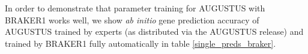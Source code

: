 \documentclass[a4paper,10pt]{report}
\begin{document}
% 

In order to demonstrate that parameter training for AUGUSTUS with BRAKER1 works well, we show \textit{ab initio} gene prediction accuracy of AUGUSTUS trained by experts (as distributed via the AUGUSTUS release) and trained by BRAKER1 fully automatically in table \ref{single_preds_braker}.
\end{document}
